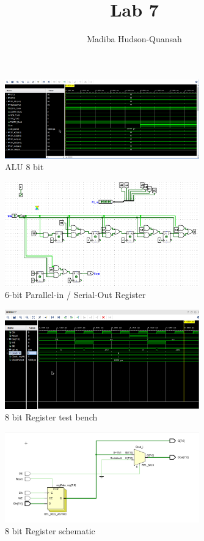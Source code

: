 \documentclass[12pt letter]{report}
\title{\Huge{Lab 7}}
\author{\huge{Madiba Hudson-Quansah}}
\date{}
\begin{document}
\maketitle
\newpage

\begin{figure}[H]
  \centering
  \includegraphics[width=0.75\textwidth]{alu_tb.png}
  \caption{ALU 8 bit}
\end{figure}

\begin{figure}[H]
  \centering
  \includegraphics[width=0.75\textwidth]{sixout.png}
  \caption{6-bit Parallel-in / Serial-Out Register}
\end{figure}

\begin{figure}[H]
  \centering
  \includegraphics[width=0.75\textwidth]{reg8.png}
  \caption{8 bit Register test bench}
\end{figure}

\begin{figure}[H]
  \centering
  \includegraphics[width=0.75\textwidth]{reg8_sch.png}
  \caption{8 bit Register schematic}
\end{figure}
\end{document}
